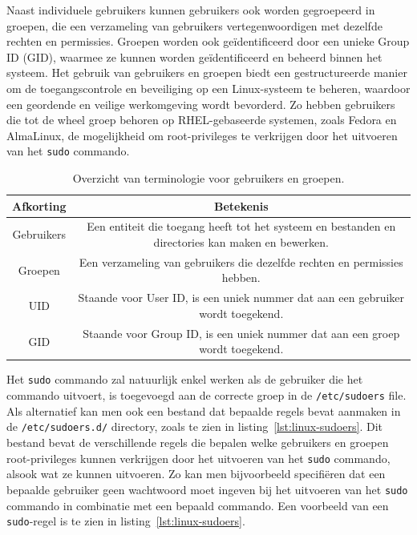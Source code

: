 Naast individuele gebruikers kunnen gebruikers ook worden gegroepeerd in groepen, die een verzameling van gebruikers vertegenwoordigen met dezelfde rechten en permissies.
Groepen worden ook ge\"identificeerd door een unieke Group ID (GID), waarmee ze kunnen worden ge\"identificeerd en beheerd binnen het systeem.
Het gebruik van gebruikers en groepen biedt een gestructureerde manier om de toegangscontrole en beveiliging op een Linux-systeem te beheren, waardoor een geordende en veilige werkomgeving wordt bevorderd.
Zo hebben gebruikers die tot de wheel groep behoren op RHEL-gebaseerde systemen, zoals Fedora en AlmaLinux, de mogelijkheid om root-privileges te verkrijgen door het uitvoeren van het \texttt{sudo} commando.

\begin{table}[!h]
    \begin{adjustbox}{width=1\textwidth}
        \begin{tabular}{ c c  }
            \hline
                Afkorting & Betekenis\\ [0.5ex] 
            \hline
                Gebruikers & Een entiteit die toegang heeft tot het systeem en bestanden en directories kan maken en bewerken. \\
                Groepen    & Een verzameling van gebruikers die dezelfde rechten en permissies hebben. \\
                UID        & Staande voor User ID, is een uniek nummer dat aan een gebruiker wordt toegekend. \\
                GID        & Staande voor Group ID, is een uniek nummer dat aan een groep wordt toegekend. \\
        \end{tabular}
    \end{adjustbox}
    \caption[Terminologie voor gebruikers en groepen.]{Overzicht van terminologie voor gebruikers en groepen.}
    \label{table:user-group-terminology}
\end{table}

Het \texttt{sudo} commando zal natuurlijk enkel werken als de gebruiker die het commando uitvoert, is toegevoegd aan de correcte groep in de \texttt{/etc/sudoers} file.
Als alternatief kan men ook een bestand dat bepaalde regels bevat aanmaken in de \texttt{/etc/sudoers.d/} directory, zoals te zien in listing~\ref{lst:linux-sudoers}.
Dit bestand bevat de verschillende regels die bepalen welke gebruikers en groepen root-privileges kunnen verkrijgen door het uitvoeren van het \texttt{sudo} commando, alsook wat ze kunnen uitvoeren.
Zo kan men bijvoorbeeld specifi\"eren dat een bepaalde gebruiker geen wachtwoord moet ingeven bij het uitvoeren van het \texttt{sudo} commando in combinatie met een bepaald commando.
Een voorbeeld van een \texttt{sudo}-regel is te zien in listing~\ref{lst:linux-sudoers}.

